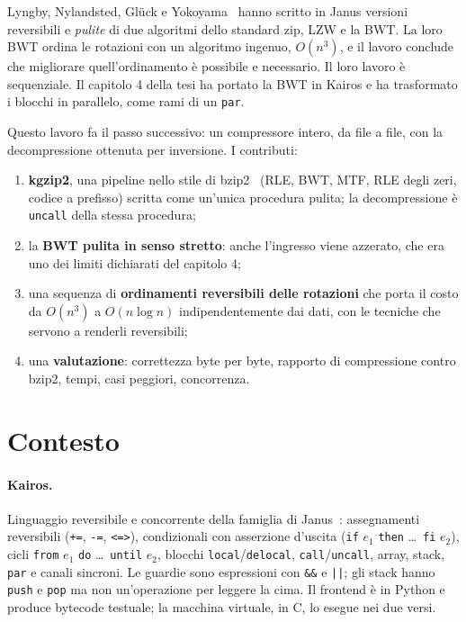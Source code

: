 \documentclass[11pt,a4paper]{article}
\newcommand{\kw}[1]{\texttt{#1}}
\begin{document}
Lyngby, Nylandsted, Glück e Yokoyama~\cite{lyngby} hanno scritto in Janus versioni reversibili e \emph{pulite} di due algoritmi dello standard zip, LZW e la BWT. La loro BWT ordina le rotazioni con un algoritmo ingenuo, $O(n^3)$, e il lavoro conclude che migliorare quell'ordinamento è possibile e necessario. Il loro lavoro è sequenziale. Il capitolo 4 della tesi ha portato la BWT in Kairos e ha trasformato i blocchi in parallelo, come rami di un \kw{par}.

Questo lavoro fa il passo successivo: un compressore intero, da file a file, con la decompressione ottenuta per inversione. I contributi:
\begin{enumerate}
\item \textbf{kgzip2}, una pipeline nello stile di bzip2~\cite{bzip2} (RLE, BWT, MTF, RLE degli zeri, codice a prefisso) scritta come un'unica procedura pulita; la decompressione è \kw{uncall} della stessa procedura;
\item la \textbf{BWT pulita in senso stretto}: anche l'ingresso viene azzerato, che era uno dei limiti dichiarati del capitolo 4;
\item una sequenza di \textbf{ordinamenti reversibili delle rotazioni} che porta il costo da $O(n^3)$ a $O(n\log n)$ indipendentemente dai dati, con le tecniche che servono a renderli reversibili;
\item una \textbf{valutazione}: correttezza byte per byte, rapporto di compressione contro bzip2, tempi, casi peggiori, concorrenza.
\end{enumerate}

\section{Contesto}

\paragraph{Kairos.} Linguaggio reversibile e concorrente della famiglia di Janus~\cite{janus}: assegnamenti reversibili (\kw{+=}, \kw{-=}, \kw{<=>}), condizionali con asserzione d'uscita (\kw{if} $e_1$ \kw{then} \dots\ \kw{fi} $e_2$), cicli \kw{from} $e_1$ \kw{do} \dots\ \kw{until} $e_2$, blocchi \kw{local}/\kw{delocal}, \kw{call}/\kw{uncall}, array, stack, \kw{par} e canali sincroni. Le guardie sono espressioni con \kw{\&\&} e \kw{||}; gli stack hanno \kw{push} e \kw{pop} ma non un'operazione per leggere la cima. Il frontend è in Python e produce bytecode testuale; la macchina virtuale, in C, lo esegue nei due versi.
\end{document}
